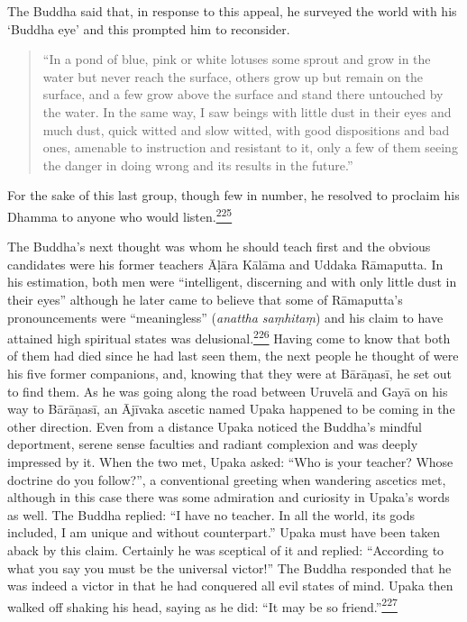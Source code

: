 The Buddha said that, in response to this appeal, he surveyed the world
with his `Buddha eye' and this prompted him to reconsider.

\begin{quote}
``In a pond of blue, pink or white lotuses some sprout and grow in the
water but never reach the surface, others grow up but remain on the
surface, and a few grow above the surface and stand there untouched by
the water. In the same way, I saw beings with little dust in their eyes
and much dust, quick witted and slow witted, with good dispositions and
bad ones, amenable to instruction and resistant to it, only a few of
them seeing the danger in doing wrong and its results in the future.''
\end{quote}

For the sake of this last group, though few in number, he resolved to
proclaim his Dhamma to anyone who would
listen.\label{footprints_split_009.html_fnref225}\hyperref[footprints_split_024.htmlux5cux23fn225]{\textsuperscript{225}}

The Buddha's next thought was whom he should teach first and the obvious
candidates were his former teachers Āḷāra Kālāma and Uddaka Rāmaputta.
In his estimation, both men were ``intelligent, discerning and with only
little dust in their eyes'' although he later came to believe that some
of Rāmaputta's pronouncements were ``meaningless'' (\emph{anattha
saṃhitaṃ}) and his claim to have attained high spiritual states was
delusional.\label{footprints_split_009.html_fnref226}\hyperref[footprints_split_024.htmlux5cux23fn226]{\textsuperscript{226}}
Having come to know that both of them had died since he had last seen
them, the next people he thought of were his five former companions,
and, knowing that they were at Bārāṇasī, he set out to find them. As he
was going along the road between Uruvelā and Gayā on his way to
Bārāṇasī, an Ājīvaka ascetic named Upaka happened to be coming in the
other direction. Even from a distance Upaka noticed the Buddha's mindful
deportment, serene sense faculties and radiant complexion and was deeply
impressed by it. When the two met, Upaka asked: ``Who is your teacher?
Whose doctrine do you follow?'', a conventional greeting when wandering
ascetics met, although in this case there was some admiration and
curiosity in Upaka's words as well. The Buddha replied: ``I have no
teacher. In all the world, its gods included, I am unique and without
counterpart.'' Upaka must have been taken aback by this claim. Certainly
he was sceptical of it and replied: ``According to what you say you must
be the universal victor!'' The Buddha responded that he was indeed a
victor in that he had conquered all evil states of mind. Upaka then
walked off shaking his head, saying as he did: ``It may be so
friend.''\label{footprints_split_009.html_fnref227}\hyperref[footprints_split_024.htmlux5cux23fn227]{\textsuperscript{227}}

